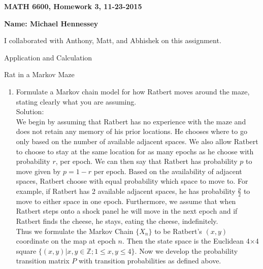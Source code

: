 \documentclass[12pt]{article}
\numberwithin{equation}{section}
\begin{document}
{\large\bf MATH 6600, Homework 3, 11-23-2015}

\vspace{6 ex}

{\bf Name: Michael Hennessey} \hfill

\vspace{6 ex}
I collaborated with Anthony, Matt, and Abhishek on this assignment.
\begin{section}{Application and Calculation}
\begin{subsection}{Rat in a Markov Maze}
\begin{enumerate}
\item Formulate a Markov chain model for how Ratbert moves around the maze, stating clearly what you are assuming.\\

    Solution:\\

    We begin by assuming that Ratbert has no experience with the maze and does not retain any memory of his prior locations. He chooses where to go only based on the number of available adjacent spaces. We also allow Ratbert to choose to stay at the same location for as many epochs as he choose with probability $r$, per epoch. We can then say that Ratbert has probability $p$ to move given by $p=1-r$ per epoch. Based on the availability of adjacent spaces, Ratbert choose with equal probability which space to move to. For example, if Ratbert has 2 available adjacent spaces, he has probability $\frac{p}{2}$ to move to either space in one epoch. Furthermore, we assume that when Ratbert steps onto a shock panel he will move in the next epoch and if Ratbert finds the cheese, he stays, eating the cheese, indefinitely.\\

    Thus we formulate the Markov Chain $\{X_n\}$ to be Ratbert's $(x,y)$ coordinate on the map at epoch $n$. Then the state space is the Euclidean 4$\times$4 square $\{(x,y)|x,y\in\mathbb{Z};1\leq x,y\leq 4\}$. Now we develop the probability transition matrix $P$ with transition probabilities as defined above.


\end{enumerate}
\end{subsection}
\end{section}
\end{document}
